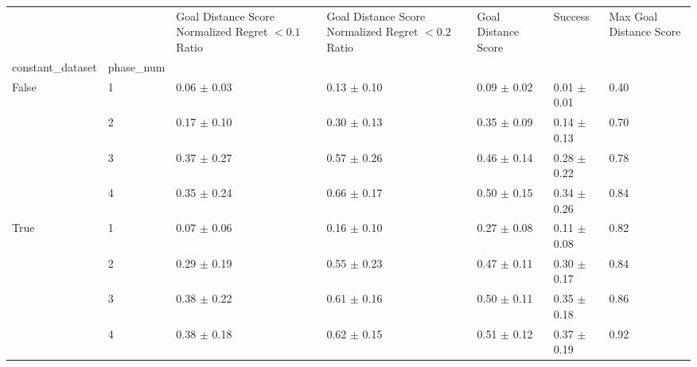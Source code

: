 \begin{tabular}{lllllll}
\toprule
 &  & Goal Distance Score Normalized Regret $< 0.1$ Ratio & Goal Distance Score Normalized Regret $< 0.2$ Ratio & Goal Distance Score & Success & Max Goal Distance Score \\
constant_dataset & phase_num &  &  &  &  &  \\
\midrule
\multirow[t]{4}{*}{False} & 1 & 0.06 $\pm$ 0.03 & 0.13 $\pm$ 0.10 & 0.09 $\pm$ 0.02 & 0.01 $\pm$ 0.01 & 0.40 \\
 & 2 & 0.17 $\pm$ 0.10 & 0.30 $\pm$ 0.13 & 0.35 $\pm$ 0.09 & 0.14 $\pm$ 0.13 & 0.70 \\
 & 3 & 0.37 $\pm$ 0.27 & 0.57 $\pm$ 0.26 & 0.46 $\pm$ 0.14 & 0.28 $\pm$ 0.22 & 0.78 \\
 & 4 & 0.35 $\pm$ 0.24 & 0.66 $\pm$ 0.17 & 0.50 $\pm$ 0.15 & 0.34 $\pm$ 0.26 & 0.84 \\
\cline{1-7}
\multirow[t]{4}{*}{True} & 1 & 0.07 $\pm$ 0.06 & 0.16 $\pm$ 0.10 & 0.27 $\pm$ 0.08 & 0.11 $\pm$ 0.08 & 0.82 \\
 & 2 & 0.29 $\pm$ 0.19 & 0.55 $\pm$ 0.23 & 0.47 $\pm$ 0.11 & 0.30 $\pm$ 0.17 & 0.84 \\
 & 3 & 0.38 $\pm$ 0.22 & 0.61 $\pm$ 0.16 & 0.50 $\pm$ 0.11 & 0.35 $\pm$ 0.18 & 0.86 \\
 & 4 & 0.38 $\pm$ 0.18 & 0.62 $\pm$ 0.15 & 0.51 $\pm$ 0.12 & 0.37 $\pm$ 0.19 & 0.92 \\
\cline{1-7}
\bottomrule
\end{tabular}
